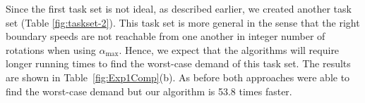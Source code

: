 \begin{table}
\begin{center}
\caption{Runtime Comparison of Digraph Real-Time and Knapsack AVR Algorithm: DBF over 1$s$}
\label{fig:Exp1Comp}

\end{center}
\end{table}
Since the first task set is not ideal, as described earlier, we created another task set (Table \ref{fig:taskset-2}). This task set is more general in the sense that the right boundary speeds are not reachable from one another in integer number of rotations when using $\alpha_{\max}$. Hence, we expect that the algorithms will require longer running times to find the worst-case demand of this task set.
The results are shown in Table~\ref{fig:Exp1Comp}(b). As before both approaches were able to find the worst-case demand but our algorithm is 53.8 times faster.

